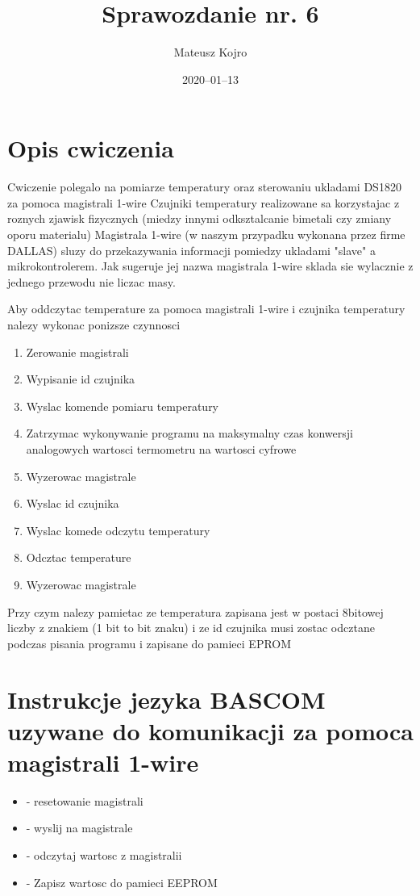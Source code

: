 \documentclass{article}
\title{Sprawozdanie nr. 6}
\author{Mateusz Kojro}
\date{2020–01–13}
\begin{document}
\maketitle

\section{Opis cwiczenia}

Cwiczenie polegalo na pomiarze temperatury oraz sterowaniu ukladami DS1820 za pomoca magistrali 1-wire
Czujniki temperatury realizowane sa korzystajac z roznych zjawisk fizycznych (miedzy innymi odksztalcanie bimetali czy zmiany oporu materialu)
Magistrala 1-wire (w naszym przypadku wykonana przez firme DALLAS) sluzy do przekazywania informacji pomiedzy
ukladami "slave" a mikrokontrolerem. Jak sugeruje jej nazwa magistrala 1-wire sklada sie wylacznie z jednego przewodu
nie liczac masy.

Aby oddczytac temperature za pomoca magistrali 1-wire i czujnika temperatury nalezy wykonac ponizsze czynnosci

\begin{enumerate}
  \item Zerowanie magistrali
  \item Wypisanie id czujnika
  \item Wyslac komende pomiaru temperatury
  \item Zatrzymac wykonywanie programu na maksymalny czas konwersji analogowych wartosci termometru na wartosci cyfrowe
  \item Wyzerowac magistrale
  \item Wyslac id czujnika
  \item Wyslac komede odczytu temperatury
  \item Odcztac temperature
  \item Wyzerowac magistrale
\end{enumerate}

Przy czym nalezy pamietac ze temperatura zapisana jest w postaci 8bitowej liczby z znakiem (1 bit to bit znaku)
i ze id czujnika musi zostac odcztane podczas pisania programu i zapisane do pamieci EPROM

\section{Instrukcje jezyka BASCOM uzywane do komunikacji za pomoca magistrali 1-wire}

\begin{itemize}
  \item {} - resetowanie magistrali
  \item {} - wyslij  na magistrale
  \item {} - odczytaj wartosc z magistralii
  \item {} - Zapisz wartosc do pamieci EEPROM
\end{itemize}
\end{document}
